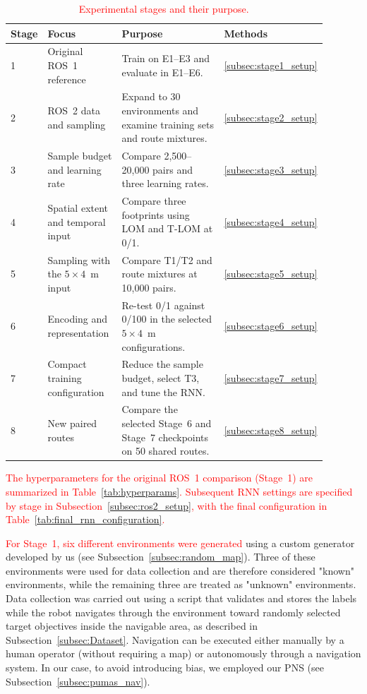 \documentclass[robotics,article,submit,pdftex,moreauthors]{Definitions/mdpi}
\begin{document}
\begin{table}[htbp]
\centering
\caption{\textcolor{red}{Experimental stages and their purpose.}}
\label{tab:experimental_stages}
\color{red}
\small
\begin{tabular}{@{}p{0.06\linewidth}p{0.25\linewidth}p{0.48\linewidth}p{0.10\linewidth}@{}}
\toprule
Stage & Focus & Purpose & Methods \\
\midrule
1 & Original ROS~1 reference & Train on E1--E3 and evaluate in E1--E6. & \ref{subsec:stage1_setup} \\
2 & ROS~2 data and sampling & Expand to 30 environments and examine training sets and route mixtures. & \ref{subsec:stage2_setup} \\
3 & Sample budget and learning rate & Compare 2,500--20,000 pairs and three learning rates. & \ref{subsec:stage3_setup} \\
4 & Spatial extent and temporal input & Compare three footprints using LOM and T-LOM at 0/1. & \ref{subsec:stage4_setup} \\
5 & Sampling with the $5\times4$~m input & Compare T1/T2 and route mixtures at 10,000 pairs. & \ref{subsec:stage5_setup} \\
6 & Encoding and representation & Re-test 0/1 against 0/100 in the selected $5\times4$~m configurations. & \ref{subsec:stage6_setup} \\
7 & Compact training configuration & Reduce the sample budget, select T3, and tune the RNN. & \ref{subsec:stage7_setup} \\
8 & New paired routes & Compare the selected Stage~6 and Stage~7 checkpoints on 50 shared routes. & \ref{subsec:stage8_setup} \\
\bottomrule
\end{tabular}
\end{table}

\textcolor{red}{The hyperparameters for the original ROS~1 comparison (Stage~1) are summarized in Table~\ref{tab:hyperparams}. Subsequent RNN settings are specified by stage in Subsection~\ref{subsec:ros2_setup}, with the final configuration in Table~\ref{tab:final_rnn_configuration}.}

\textcolor{red}{For Stage~1, six different environments were generated} using a custom generator developed by us (see Subsection~\ref{subsec:random_map}). Three of these environments were used for data collection and are therefore considered "known" environments, while the remaining three are treated as "unknown" environments. Data collection was carried out using a script that validates and stores the labels while the robot navigates through the environment toward randomly selected target objectives inside the navigable area, as described in Subsection~\ref{subsec:Dataset}. Navigation can be executed either manually by a human operator (without requiring a map) or autonomously through a navigation system. In our case, to avoid introducing bias, we employed our PNS (see Subsection~\ref{subsec:pumas_nav}). 
\end{document}
